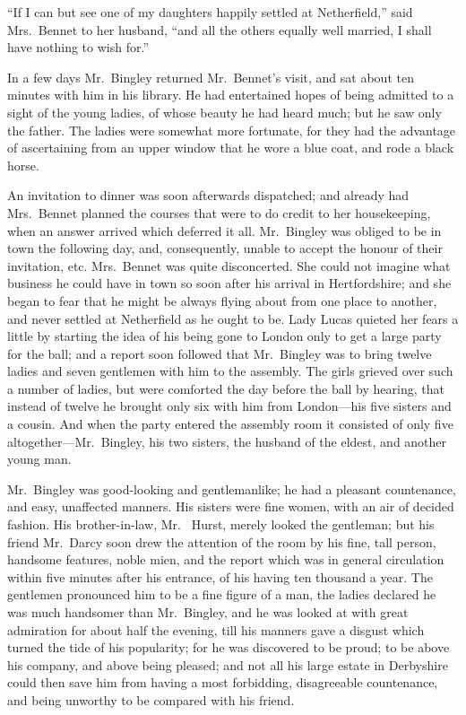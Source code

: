 ``If I can but see one of my daughters happily settled at
Netherfield,'' said Mrs.\ Bennet to her husband, ``and all the
others equally well married, I shall have nothing to wish for.''

In a few days Mr.\ Bingley returned Mr.\ Bennet's visit, and sat
about ten minutes with him in his library.  He had entertained
hopes of being admitted to a sight of the young ladies, of
whose beauty he had heard much; but he saw only the father.
The ladies were somewhat more fortunate, for they had the
advantage of ascertaining from an upper window that he wore
a blue coat, and rode a black horse.

An invitation to dinner was soon afterwards dispatched; and
already had Mrs.\ Bennet planned the courses that were to do
credit to her housekeeping, when an answer arrived which
deferred it all.  Mr.\ Bingley was obliged to be in town the
following day, and, consequently, unable to accept the honour
of their invitation, etc.  Mrs.\ Bennet was quite disconcerted.
She could not imagine what business he could have in town so
soon after his arrival in Hertfordshire; and she began to fear
that he might be always flying about from one place to another,
and never settled at Netherfield as he ought to be.  Lady Lucas
quieted her fears a little by starting the idea of his being gone
to London only to get a large party for the ball; and a report
soon followed that Mr.\ Bingley was to bring twelve ladies and
seven gentlemen with him to the assembly.  The girls grieved
over such a number of ladies, but were comforted the day
before the ball by hearing, that instead of twelve he brought
only six with him from London---his five sisters and a cousin.
And when the party entered the assembly room it consisted of
only five altogether---Mr.\ Bingley, his two sisters, the husband
of the eldest, and another young man.

Mr.\ Bingley was good-looking and gentlemanlike; he had a pleasant
countenance, and easy, unaffected manners.  His sisters were fine
women, with an air of decided fashion.  His brother-in-law, Mr.\ %
Hurst, merely looked the gentleman; but his friend Mr.\ Darcy soon
drew the attention of the room by his fine, tall person, handsome
features, noble mien, and the report which was in general
circulation within five minutes after his entrance, of his having
ten thousand a year.  The gentlemen pronounced him to be a fine
figure of a man, the ladies declared he was much handsomer than
Mr.\ Bingley, and he was looked at with great admiration for about
half the evening, till his manners gave a disgust which turned
the tide of his popularity; for he was discovered to be proud;
to be above his company, and above being pleased; and not all his
large estate in Derbyshire could then save him from having a most
forbidding, disagreeable countenance, and being unworthy to be
compared with his friend.

